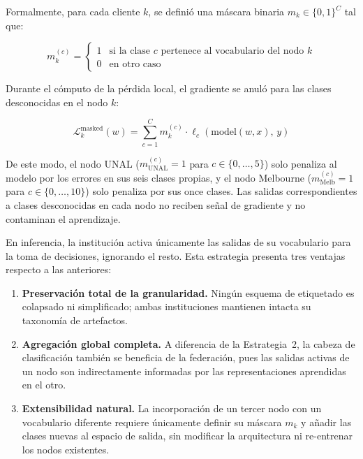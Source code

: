 Formalmente, para cada cliente $k$, se definió una máscara binaria
$m_k \in \{0,1\}^C$ tal que:
 
\[
m_k^{(c)} =
\begin{cases}
    1 & \text{si la clase } c \text{ pertenece al vocabulario del nodo } k \\
    0 & \text{en otro caso}
\end{cases}
\]
 
Durante el cómputo de la pérdida local, el gradiente se anuló para las clases
desconocidas en el nodo $k$:
 
\[
\mathcal{L}_k^{\mathrm{masked}}(w) =
    \sum_{c=1}^{C} m_k^{(c)} \cdot
    \ell_c\!\left(\mathrm{model}(w, x),\, y\right)
\]
 
De este modo, el nodo UNAL ($m_{\mathrm{UNAL}}^{(c)} = 1$ para $c \in \{0,\ldots,5\}$)
solo penaliza al modelo por los errores en sus seis clases propias, y el nodo Melbourne
($m_{\mathrm{Melb}}^{(c)} = 1$ para $c \in \{0,\ldots,10\}$) solo penaliza por sus once
clases. Las salidas correspondientes a clases desconocidas en cada nodo no reciben señal
de gradiente y no contaminan el aprendizaje.
 
En inferencia, la institución activa únicamente las salidas de su vocabulario para la
toma de decisiones, ignorando el resto. Esta estrategia presenta tres ventajas respecto a
las anteriores:
 
\begin{enumerate}
    \item \textbf{Preservación total de la granularidad.} Ningún esquema de etiquetado
    es colapsado ni simplificado; ambas instituciones mantienen intacta su taxonomía de
    artefactos.
 
    \item \textbf{Agregación global completa.} A diferencia de la Estrategia~2, la cabeza
    de clasificación también se beneficia de la federación, pues las salidas activas de un
    nodo son indirectamente informadas por las representaciones aprendidas en el otro.
 
    \item \textbf{Extensibilidad natural.} La incorporación de un tercer nodo con un
    vocabulario diferente requiere únicamente definir su máscara $m_k$ y añadir las clases
    nuevas al espacio de salida, sin modificar la arquitectura ni re-entrenar los nodos
    existentes.
\end{enumerate}
 
